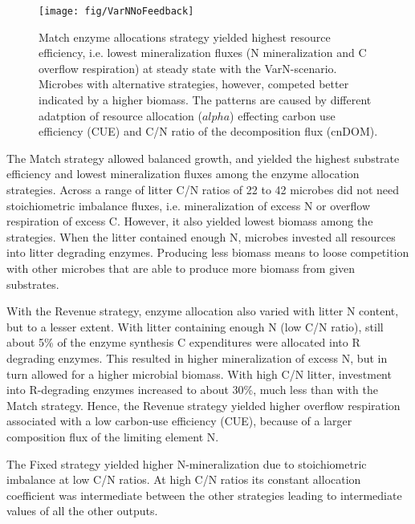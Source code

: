 \begin{figure}[t] \vspace*{2mm}
\begin{center}
\texttt{[image: fig/VarNNoFeedback]}
\end{center}
\caption{
Match enzyme allocations strategy yielded highest resource efficiency, i.e.
lowest mineralization fluxes (N mineralization and C overflow respiration) at
steady state with the VarN-scenario.
Microbes with alternative strategies, however, competed better indicated by a higher
biomass. The patterns are caused by different adatption of resource
allocation ($alpha$) effecting carbon use efficiency (CUE) and C/N ratio of the
decomposition flux (cnDOM).
\label{fig:VarNNoFeedback}}
\end{figure}

The Match strategy allowed balanced growth, and yielded the highest substrate
efficiency and lowest mineralization fluxes among the enzyme allocation
strategies. Across a range of litter C/N ratios of 22 to 42 microbes did not
need stoichiometric imbalance fluxes, i.e. mineralization of excess N or
overflow respiration of excess C. However, it also yielded lowest biomass among
the strategies. When the litter contained enough N, microbes invested all
resources into litter degrading enzymes. Producing less biomass means to loose
competition with other microbes that are able to produce more biomass from given
substrates.

With the Revenue strategy, enzyme allocation also varied with litter N content,
but to a lesser extent.
With litter containing enough N (low C/N ratio), still about 5\% of the enzyme
synthesis C expenditures were allocated into R degrading enzymes. This resulted
in higher mineralization of excess N, but in turn allowed for a higher microbial
biomass.
With high C/N litter, investment into R-degrading enzymes increased to about
30\%, much less than with the Match strategy. Hence, the Revenue strategy
yielded higher overflow respiration associated with a low carbon-use
efficiency (CUE), because of a larger composition flux of the limiting element
N.

The Fixed strategy yielded higher N-mineralization due to stoichiometric
imbalance at low C/N ratios.
At high C/N ratios its constant allocation coefficient was intermediate between
the other strategies leading to intermediate values of all the other outputs.


